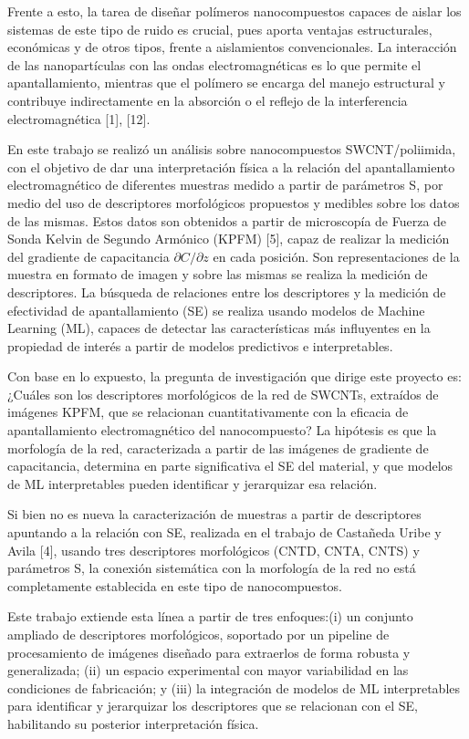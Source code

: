 Frente a esto, la tarea de diseñar polímeros nanocompuestos capaces de aislar los sistemas de este tipo de ruido es crucial, pues aporta ventajas estructurales, económicas y de otros tipos, frente a aislamientos convencionales. La interacción de las nanopartículas con las ondas electromagnéticas es lo que permite el apantallamiento, mientras que el polímero se encarga del manejo estructural y contribuye indirectamente en la absorción o el reflejo de la interferencia electromagnética [1], [12].

En este trabajo se realizó un análisis sobre nanocompuestos SWCNT/poliimida, con el objetivo de dar una interpretación física a la relación del apantallamiento electromagnético de diferentes muestras medido a partir de parámetros S, por medio del uso de descriptores morfológicos propuestos y medibles sobre los datos de las mismas. Estos datos son obtenidos a partir de microscopía de Fuerza de Sonda Kelvin de Segundo Armónico (KPFM) [5], capaz de realizar la medición del gradiente de capacitancia $\partial C/\partial z$ en cada posición. Son representaciones de la muestra en formato de imagen y sobre las mismas se realiza la medición de descriptores. La búsqueda de relaciones entre los descriptores y la medición de efectividad de apantallamiento (SE) se realiza usando modelos de Machine Learning (ML), capaces de detectar las características más influyentes en la propiedad de interés a partir de modelos predictivos e interpretables.

Con base en lo expuesto, la pregunta de investigación que dirige este proyecto es: ¿Cuáles son los descriptores morfológicos de la red de SWCNTs, extraídos de imágenes KPFM, que se relacionan cuantitativamente con la eficacia de apantallamiento electromagnético del nanocompuesto? La hipótesis es que la morfología de la red, caracterizada a partir de las imágenes de gradiente de capacitancia, determina en parte significativa el SE del material, y que modelos de ML interpretables pueden identificar y jerarquizar esa relación.

Si bien no es nueva la caracterización de muestras a partir de descriptores apuntando a la relación con SE, realizada en el trabajo de Castañeda Uribe y Avila [4], usando tres descriptores morfológicos (CNTD, CNTA, CNTS) y parámetros S, la conexión sistemática con la morfología de la red no está completamente establecida en este tipo de nanocompuestos. 

Este trabajo extiende esta línea a partir de tres enfoques:(i) un conjunto ampliado de descriptores morfológicos, soportado por un pipeline de procesamiento de imágenes diseñado para extraerlos de forma robusta y generalizada; (ii) un espacio experimental con mayor variabilidad en las condiciones de fabricación; y (iii) la integración de modelos de ML interpretables para identificar y jerarquizar los descriptores que se relacionan con el SE, habilitando su posterior interpretación física. 

